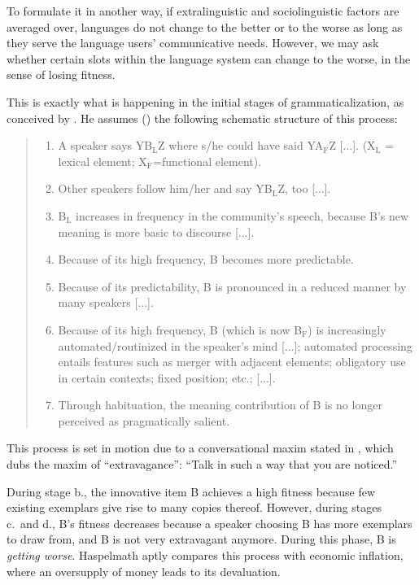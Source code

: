 \documentclass[output=paper,hidelinks]{langscibook}
\begin{document}
To formulate it in another way, if extralinguistic and sociolinguistic factors are
averaged over, languages do not change to the better or to the worse as long as they serve
the language users' communicative needs. However, we may ask whether certain slots within
the language system can change to the worse, in the sense of losing fitness.

This is exactly what is happening in the initial stages of grammaticalization, as
conceived by \citet{Haspelmath1999}. He assumes (\citeyear[1055]{Haspelmath1999}) the following schematic structure of this
process:

\begin{quote}
\begin{enumerate}[label=\alph*., leftmargin=*]
  \item A speaker says YB$_{\mathrm{L}}$Z where s/he could have said
    YA$_{\mathrm{F}}$Z [...]. (X$_{\mathrm{L}}$ = lexical element; X$_{\mathrm{F}}$=functional
    element).
  \item Other speakers follow him/her and say YB$_{\mathrm{L}}$Z, too [...].
  \item B$_{\mathrm{L}}$ increases in frequency in the community's speech, because B's
    new meaning is more basic to discourse [...].  
  \item Because of its high frequency, B becomes more predictable.
  \item Because of its predictability, B is pronounced in a reduced manner by many
    speakers [...].  
  \item Because of its high frequency, B (which is now B$_{\mathrm{F}}$) is
    increasingly automated/routinized in the speaker's mind [...]; automated processing
    entails features such as merger with adjacent elements; obligatory use in certain
    contexts; fixed position; etc.; [...].  
  \item Through habituation, the meaning contribution of B is no longer perceived as
    pragmatically salient.
\end{enumerate}
\end{quote}

This process is set in motion due to a conversational maxim stated in \citet{keller94},
which \citet{Haspelmath1999} dubs the maxim of ``extravagance'': ``Talk in such a way that
you are noticed.'' \citep[101]{keller94}

During stage b., the innovative item B achieves a high fitness because few existing
exemplars give rise to many copies thereof. However, during stages c.\ and d., B's fitness
decreases because a speaker choosing B has more exemplars to draw from, and B is not very
extravagant anymore. During this phase, B is \emph{getting worse}. Haspelmath aptly
compares this process with economic inflation, where an oversupply of money leads to its
devaluation.
\end{document}
